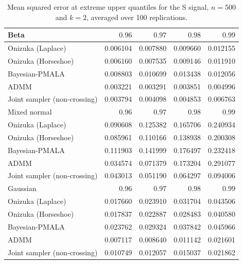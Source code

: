 \begin{table}[!htbp]
\centering
\small
\caption{Mean squared error at extreme upper quantiles for the S signal, $n=500$ and $k=2$, averaged over 100 replications.}
\label{tab:ext_s_mse}
\begin{tabular}{lrrrr}
\toprule
Beta & $0.96$ & $0.97$ & $0.98$ & $0.99$ \\
\midrule
Onizuka (Laplace) & 0.006104 & 0.007880 & 0.009660 & 0.012155 \\
Onizuka (Horseshoe) & 0.006160 & 0.007535 & 0.009146 & 0.011910 \\
Bayesian-PMALA & 0.008803 & 0.010699 & 0.013438 & 0.012056 \\
ADMM & 0.003221 & 0.003291 & 0.003851 & 0.004996 \\
Joint sampler (non-crossing) & 0.003794 & 0.004098 & 0.004853 & 0.006763 \\
\midrule
Mixed normal & $0.96$ & $0.97$ & $0.98$ & $0.99$ \\
\midrule
Onizuka (Laplace) & 0.090608 & 0.125382 & 0.165706 & 0.240934 \\
Onizuka (Horseshoe) & 0.085961 & 0.110166 & 0.138938 & 0.200308 \\
Bayesian-PMALA & 0.111903 & 0.141999 & 0.176497 & 0.232418 \\
ADMM & 0.034574 & 0.071379 & 0.173204 & 0.291077 \\
Joint sampler (non-crossing) & 0.043013 & 0.051190 & 0.064297 & 0.094006 \\
\midrule
Gaussian & $0.96$ & $0.97$ & $0.98$ & $0.99$ \\
\midrule
Onizuka (Laplace) & 0.017660 & 0.023910 & 0.031704 & 0.043506 \\
Onizuka (Horseshoe) & 0.017837 & 0.022887 & 0.028483 & 0.040580 \\
Bayesian-PMALA & 0.023762 & 0.029324 & 0.037842 & 0.045966 \\
ADMM & 0.007117 & 0.008640 & 0.011142 & 0.021601 \\
Joint sampler (non-crossing) & 0.010749 & 0.012057 & 0.015037 & 0.021862 \\
\bottomrule
\end{tabular}
\end{table}
